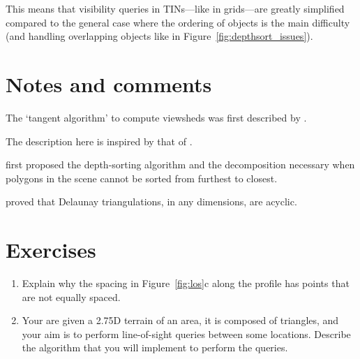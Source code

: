 %

This means that visibility queries in TINs---like in grids---are greatly simplified compared to the general case where the ordering of objects is the main difficulty (and handling overlapping objects like in Figure~\ref{fig:depthsort_issues}).



%
\section{Notes and comments}

The `tangent algorithm' to compute viewsheds was first described by \citet{Blelloch90}.

The description here is inspired by that of \citet{DeFloriani99-1}.

\citet{Newell72} first proposed the depth-sorting algorithm and the decomposition necessary when polygons in the scene cannot be sorted from furthest to closest.

\citet{Edelsbrunner90} proved that Delaunay triangulations, in any dimensions, are acyclic.

%
\section{Exercises}

\begin{enumerate}
  \item Explain why the spacing in Figure~\ref{fig:los}c along the profile has points that are not equally spaced.
  \item Your are given a 2.75D terrain of an area, it is composed of triangles, and your aim is to perform line-of-sight queries between some locations. Describe the algorithm that you will implement to perform the queries.
\end{enumerate}
